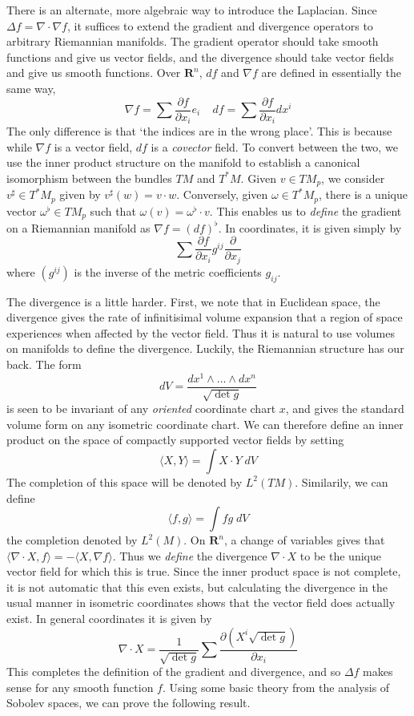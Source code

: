 \documentclass{article}
\theoremstyle{plain}
\theoremstyle{remark}
\theoremstyle{definition}
\begin{document}
There is an alternate, more algebraic way to introduce the Laplacian. Since $\Delta f = \nabla \cdot \nabla f$, it suffices to extend the gradient and divergence operators to arbitrary Riemannian manifolds. The gradient operator should take smooth functions and give us vector fields, and the divergence should take vector fields and give us smooth functions. Over $\mathbf{R}^n$, $df$ and $\nabla f$ are defined in essentially the same way,
%
\[ \nabla f = \sum \frac{\partial f}{\partial x_i} e_i\ \ \ \ \ df = \sum \frac{\partial f}{\partial x_i} dx^i \]
%
The only difference is that `the indices are in the wrong place'. This is because while $\nabla f$ is a vector field, $df$ is a {\it covector} field. To convert between the two, we use the inner product structure on the manifold to establish a canonical isomorphism between the bundles $TM$ and $T^*M$. Given $v \in TM_p$, we consider $v^\sharp \in T^*M_p$ given by $v^\sharp(w) = v \cdot w$. Conversely, given $\omega \in T^*M_p$, there is a unique vector $\omega^\flat \in TM_p$ such that $\omega(v) = \omega^\flat \cdot v$. This enables us to {\it define} the gradient on a Riemannian manifold as $\nabla f = (df)^\flat$. In coordinates, it is given simply by
%
\[ \sum \frac{\partial f}{\partial x_i} g^{ij} \frac{\partial}{\partial x_j} \]
%
where $(g^{ij})$ is the inverse of the metric coefficients $g_{ij}$.

The divergence is a little harder. First, we note that in Euclidean space, the divergence gives the rate of infinitisimal volume expansion that a region of space experiences when affected by the vector field. Thus it is natural to use volumes on manifolds to define the divergence. Luckily, the Riemannian structure has our back. The form
%
\[ dV = \frac{dx^1 \wedge \dots \wedge dx^n}{\sqrt{\det g}}  \]
%
is seen to be invariant of any {\it oriented} coordinate chart $x$, and gives the standard volume form on any isometric coordinate chart. We can therefore define an inner product on the space of compactly supported vector fields by setting
%
\[ \langle X, Y \rangle = \int X \cdot Y\; dV \]
%
The completion of this space will be denoted by $L^2(TM)$. Similarily, we can define
%
\[ \langle f, g \rangle = \int fg\; dV \]
%
the completion denoted by $L^2(M)$. On $\mathbf{R}^n$, a change of variables gives that $\langle \nabla \cdot X, f \rangle = - \langle X, \nabla f \rangle$. Thus we {\it define} the divergence $\nabla \cdot X$ to be the unique vector field for which this is true. Since the inner product space is not complete, it is not automatic that this even exists, but calculating the divergence in the usual manner in isometric coordinates shows that the vector field does actually exist. In general coordinates it is given by
%
\[ \nabla \cdot X = \frac{1}{\sqrt{\det g}} \sum \frac{\partial (X^i \sqrt{\det g})}{\partial x_i} \]
%
This completes the definition of the gradient and divergence, and so $\Delta f$ makes sense for any smooth function $f$. Using some basic theory from the analysis of Sobolev spaces, we can prove the following result.
\end{document}
